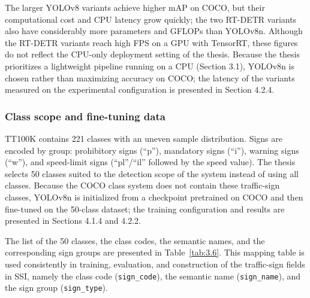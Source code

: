 \documentclass[12pt,a4paper]{report}
\begin{document}
The larger YOLOv8 variants achieve higher mAP on COCO, but their computational cost and CPU latency grow quickly; the two RT-DETR variants also have considerably more parameters and GFLOPs than YOLOv8n. Although the RT-DETR variants reach high FPS on a GPU with TensorRT, these figures do not reflect the CPU-only deployment setting of the thesis. Because the thesis prioritizes a lightweight pipeline running on a CPU (Section 3.1), YOLOv8n is chosen rather than maximizing accuracy on COCO; the latency of the variants measured on the experimental configuration is presented in Section 4.2.4.

\subsubsection*{Class scope and fine-tuning data}

TT100K contains 221 classes with an uneven sample distribution. Signs are encoded by group: prohibitory signs (``p''), mandatory signs (``i''), warning signs (``w''), and speed-limit signs (``pl''/``il'' followed by the speed value). The thesis selects 50 classes suited to the detection scope of the system instead of using all classes. Because the COCO class system does not contain these traffic-sign classes, YOLOv8n is initialized from a checkpoint pretrained on COCO and then fine-tuned on the 50-class dataset; the training configuration and results are presented in Sections 4.1.4 and 4.2.2.

The list of the 50 classes, the class codes, the semantic names, and the corresponding sign groups are presented in Table~\ref{tab:3.6}. This mapping table is used consistently in training, evaluation, and construction of the traffic-sign fields in SSI, namely the class code (\texttt{sign\_code}), the semantic name (\texttt{sign\_name}), and the sign group (\texttt{sign\_type}).
\end{document}
